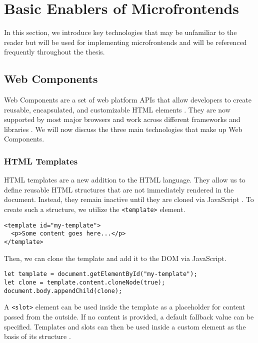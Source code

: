 \section{Basic Enablers of Microfrontends}
In this section, we introduce key technologies that may be unfamiliar to the reader but will be used for implementing microfrontends and will be referenced frequently throughout the thesis.

\subsection{Web Components}
Web Components are a set of web platform APIs that allow developers to create reusable, encapsulated, and customizable HTML elements \cite{MDNWebComponents}. They are now supported by most major browsers and work across different frameworks and libraries \cite{EisenbergWebComponents}. We will now discuss the three main technologies that make up Web Components.

\subsubsection{HTML Templates}
HTML templates are a new addition to the HTML language. They allow us to define reusable HTML structures that are not immediately rendered in the document. Instead, they remain inactive until they are cloned via JavaScript \cite{MDNWebComponents}. To create such a structure, we utilize the \texttt{<template>} element.
\begin{verbatim}
<template id="my-template">
  <p>Some content goes here...</p>
</template>
\end{verbatim}
Then, we can clone the template and add it to the DOM via JavaScript.
\begin{verbatim}
let template = document.getElementById("my-template");
let clone = template.content.cloneNode(true);
document.body.appendChild(clone);
\end{verbatim}
A \texttt{<slot>} element can be used inside the template as a placeholder for content passed from the outside. If no content is provided, a default fallback value can be specified. Templates and slots can then be used inside a custom element as the basis of its structure \cite{MDNWebComponents}. 

